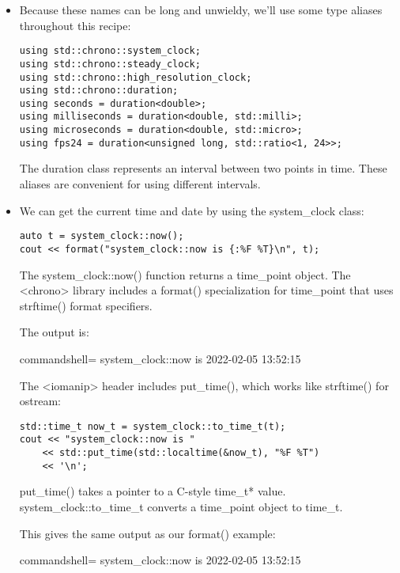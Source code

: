 \begin{itemize}
\item 
Because these names can be long and unwieldy, we'll use some type aliases throughout this recipe:

\begin{lstlisting}[style=styleCXX]
using std::chrono::system_clock;
using std::chrono::steady_clock;
using std::chrono::high_resolution_clock;
using std::chrono::duration;
using seconds = duration<double>;
using milliseconds = duration<double, std::milli>;
using microseconds = duration<double, std::micro>;
using fps24 = duration<unsigned long, std::ratio<1, 24>>;
\end{lstlisting}

The duration class represents an interval between two points in time. These aliases are convenient for using different intervals.

\item 
We can get the current time and date by using the system\_clock class:

\begin{lstlisting}[style=styleCXX]
auto t = system_clock::now();
cout << format("system_clock::now is {:%F %T}\n", t);
\end{lstlisting}

The system\_clock::now() function returns a time\_point object. The <chrono> library includes a format() specialization for time\_point that uses strftime() format specifiers.

The output is:

\begin{tcblisting}{commandshell={}}
system_clock::now is 2022-02-05 13:52:15
\end{tcblisting}

The <iomanip> header includes put\_time(), which works like strftime() for ostream:

\begin{lstlisting}[style=styleCXX]
std::time_t now_t = system_clock::to_time_t(t);
cout << "system_clock::now is "
	<< std::put_time(std::localtime(&now_t), "%F %T")
	<< '\n';
\end{lstlisting}

put\_time() takes a pointer to a C-style time\_t* value. system\_clock::to\_time\_t converts a time\_point object to time\_t.

This gives the same output as our format() example:

\begin{tcblisting}{commandshell={}}
system_clock::now is 2022-02-05 13:52:15
\end{tcblisting}


\end{itemize}
